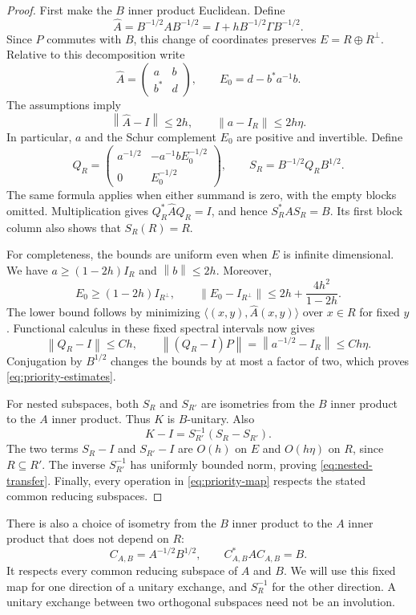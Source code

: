 \documentclass[11pt]{article}
\numberwithin{equation}{section}
\theoremstyle{definition}
\theoremstyle{remark}
\newcommand{\norm}[1]{\left\lVert#1\right\rVert}
\newcommand{\id}{I}
\begin{document}
\begin{proof}
First make the $B$ inner product Euclidean.  Define
\[
 \widehat A=B^{-1/2}AB^{-1/2}
   =\id+hB^{-1/2}\Gamma B^{-1/2}.
\]
Since $P$ commutes with $B$, this change of coordinates preserves
$E=R\oplus R^\perp$.  Relative to this decomposition write
\[
 \widehat A=\begin{pmatrix}a&b\\b^*&d\end{pmatrix},
 \qquad E_0=d-b^*a^{-1}b.
\]
The assumptions imply
\[
 \norm{\widehat A-\id}\leq2h,
 \qquad \norm{a-\id_R}\leq2h\eta.
\]
In particular, $a$ and the Schur complement $E_0$ are positive and
invertible.  Define
\begin{equation}\label{eq:priority-map}
 Q_R=
 \begin{pmatrix}
 a^{-1/2}&-a^{-1}bE_0^{-1/2}\\
 0&E_0^{-1/2}
 \end{pmatrix},
 \qquad S_R=B^{-1/2}Q_RB^{1/2}.
\end{equation}
The same formula applies when either summand is zero, with the empty
blocks omitted.  Multiplication gives
$Q_R^*\widehat A Q_R=\id$, and hence $S_R^*AS_R=B$.
Its first block column also shows that $S_R(R)=R$.

For completeness, the bounds are uniform even when $E$ is infinite
dimensional.  We have $a\geq(1-2h)\id_R$ and
$\norm{b}\leq2h$.  Moreover,
\[
 E_0\geq(1-2h)\id_{R^\perp},\qquad
 \norm{E_0-\id_{R^\perp}}
 \leq2h+\frac{4h^2}{1-2h}.
\]
The lower bound follows by minimizing
$\langle (x,y),\widehat A(x,y)\rangle$ over $x\in R$ for fixed $y$.
Functional calculus in these fixed spectral intervals now gives
\[
 \norm{Q_R-\id}\leq Ch,
 \qquad
 \norm{(Q_R-\id)P}
   =\norm{a^{-1/2}-\id_R}\leq Ch\eta.
\]
Conjugation by $B^{1/2}$ changes the bounds by at most a factor of two,
which proves \eqref{eq:priority-estimates}.

For nested subspaces, both $S_R$ and $S_{R'}$ are isometries from the
$B$ inner product to the $A$ inner product.  Thus $K$ is $B$-unitary.
Also
\[
 K-\id=S_{R'}^{-1}(S_R-S_{R'}).
\]
The two terms $S_R-\id$ and $S_{R'}-\id$ are $O(h)$ on $E$ and
$O(h\eta)$ on $R$, since $R\subseteq R'$.  The inverse $S_{R'}^{-1}$
has uniformly bounded norm, proving \eqref{eq:nested-transfer}.
Finally, every operation in \eqref{eq:priority-map} respects the stated
common reducing subspaces.
\end{proof}

There is also a choice of isometry from the $B$ inner product to the
$A$ inner product that does not depend on $R$:
\begin{equation}\label{eq:fixed-transfer}
 C_{A,B}=A^{-1/2}B^{1/2},\qquad C_{A,B}^*AC_{A,B}=B.
\end{equation}
It respects every common reducing subspace of $A$ and $B$.
We will use this fixed map for one direction of a unitary exchange, and
$S_R^{-1}$ for the other direction.  A unitary exchange between two
orthogonal subspaces need not be an involution.
\end{document}
